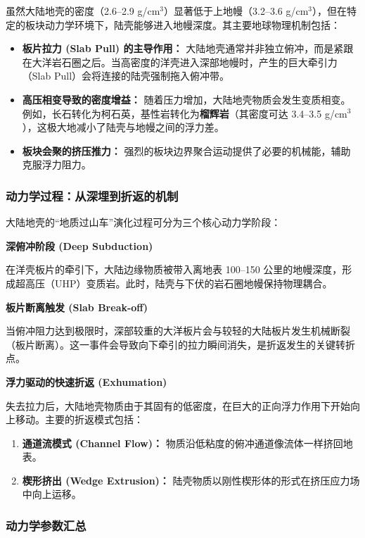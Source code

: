 \documentclass[12pt,a4paper]{article}
\begin{document}
	虽然大陆地壳的密度（2.6--2.9 g/cm$^3$）显著低于上地幔（3.2--3.6 g/cm$^3$），但在特定的板块动力学环境下，陆壳能够进入地幔深度。其主要地球物理机制包括：
	
	\begin{itemize}[leftmargin=1.5em]
		\item \textbf{板片拉力 (Slab Pull) 的主导作用：} 大陆地壳通常并非独立俯冲，而是紧跟在大洋岩石圈之后。当高密度的洋壳进入深部地幔时，产生的巨大牵引力（Slab Pull）会将连接的陆壳强制拖入俯冲带。
		\item \textbf{高压相变导致的密度增益：} 随着压力增加，大陆地壳物质会发生变质相变。例如，长石转化为柯石英，基性岩转化为\textbf{榴辉岩}（其密度可达 3.4--3.5 g/cm$^3$），这极大地减小了陆壳与地幔之间的浮力差。
		\item \textbf{板块会聚的挤压推力：} 强烈的板块边界聚合运动提供了必要的机械能，辅助克服浮力阻力。
	\end{itemize}
	
	\subsubsection{动力学过程：从深埋到折返的机制}
	
	大陆地壳的“地质过山车”演化过程可分为三个核心动力学阶段：
	
	\textbf{深俯冲阶段 (Deep Subduction)}
	
	在洋壳板片的牵引下，大陆边缘物质被带入离地表 100--150 公里的地幔深度，形成超高压（UHP）变质岩。此时，陆壳与下伏的岩石圈地幔保持物理耦合。
	
	\textbf{板片断离触发 (Slab Break-off)}
	
	当俯冲阻力达到极限时，深部较重的大洋板片会与较轻的大陆板片发生机械断裂（板片断离）。这一事件会导致向下牵引的拉力瞬间消失，是折返发生的关键转折点。
	
	\textbf{浮力驱动的快速折返 (Exhumation)}
	
	失去拉力后，大陆地壳物质由于其固有的低密度，在巨大的正向浮力作用下开始向上移动。主要的折返模式包括：
	\begin{enumerate}
		\item \textbf{通道流模式 (Channel Flow)：} 物质沿低粘度的俯冲通道像流体一样挤回地表。
		\item \textbf{楔形挤出 (Wedge Extrusion)：} 陆壳物质以刚性楔形体的形式在挤压应力场中向上运移。
	\end{enumerate}
	
	\subsubsection{动力学参数汇总}
	
\end{document}
